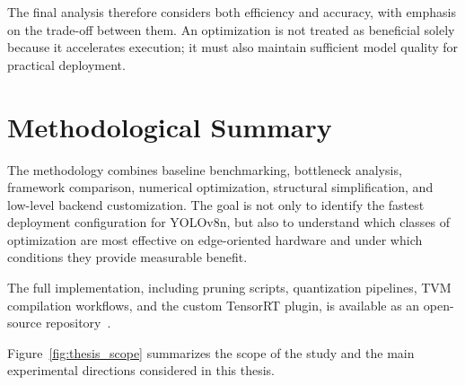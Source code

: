 \documentclass[12pt,a4paper]{report}
\begin{document}
The final analysis therefore considers both efficiency and accuracy, with emphasis on the trade-off between them. An
optimization is not treated as beneficial solely because it accelerates execution; it must also maintain sufficient
model quality for practical deployment.

\section{Methodological Summary}

The methodology combines baseline benchmarking, bottleneck analysis, framework comparison, numerical optimization,
structural simplification, and low-level backend customization. The goal is not only to identify the fastest deployment
configuration for YOLOv8n, but also to understand which classes of optimization are most effective on edge-oriented
hardware and under which conditions they provide measurable benefit.

The full implementation, including pruning scripts, quantization pipelines, TVM compilation workflows, and the custom
TensorRT plugin, is available as an open-source repository~\cite{bukueva2026thesis}.

Figure~\ref{fig:thesis_scope} summarizes the scope of the study and the main experimental directions considered in
this thesis.
\end{document}
